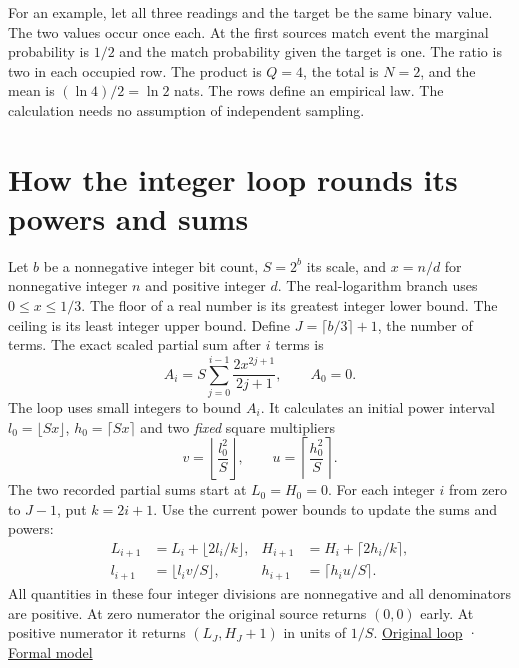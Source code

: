 For an example, let all three readings and the target be the same binary value. The two values occur once each. At the first source\textquotesingle s match event the marginal probability is \(1/2\) and the match probability given the target is one. The ratio is two in each occupied row. The product is \(Q=4\), the total is \(N=2\), and the mean is \((\ln 4)/2=\ln 2\) nats. The rows define an empirical law. The calculation needs no assumption of independent sampling.

\clearpage

\section{How the integer loop rounds its powers and sums}\label{how-the-integer-loop-rounds-its-powers-and-sums}

Let \(b\) be a nonnegative integer bit count, \(S=2^b\) its scale, and \(x=n/d\) for nonnegative integer \(n\) and positive integer \(d\). The real-logarithm branch uses \(0\le x\le1/3\). The floor of a real number is its greatest integer lower bound. The ceiling is its least integer upper bound. Define \(J=\lceil b/3\rceil+1\), the number of terms. The exact scaled partial sum after \(i\) terms is \[
A_i=S\sum_{j=0}^{i-1}\frac{2x^{2j+1}}{2j+1},\qquad A_0=0.
\] The loop uses small integers to bound \(A_i\). It calculates an initial power interval \(l_0=\lfloor Sx\rfloor\), \(h_0=\lceil Sx\rceil\) and two \emph{fixed} square multipliers \[
v=\left\lfloor\frac{l_0^2}{S}\right\rfloor,
\qquad u=\left\lceil\frac{h_0^2}{S}\right\rceil.
\] The two recorded partial sums start at \(L_0=H_0=0\). For each integer \(i\) from zero to \(J-1\), put \(k=2i+1\). Use the current power bounds to update the sums and powers: \[
\begin{aligned}
 L_{i+1}&=L_i+\lfloor 2l_i/k\rfloor, &
 H_{i+1}&=H_i+\lceil 2h_i/k\rceil,\\
 l_{i+1}&=\lfloor l_i v/S\rfloor, &
 h_{i+1}&=\lceil h_i u/S\rceil .
\end{aligned}
\] All quantities in these four integer divisions are nonnegative and all denominators are positive. At zero numerator the original source returns \((0,0)\) early. At positive numerator it returns \((L_J,H_J+1)\) in units of \(1/S\). \href{https://github.com/sepahead/pid-rs/blob/main/audit/research/three-source-six-certificate-observations/arithmetic.py}{Original loop} · \href{https://github.com/sepahead/pid-rs/blob/main/audit/research/signed-log-certificate-enclosure/formal/Model.lean}{Formal model}

